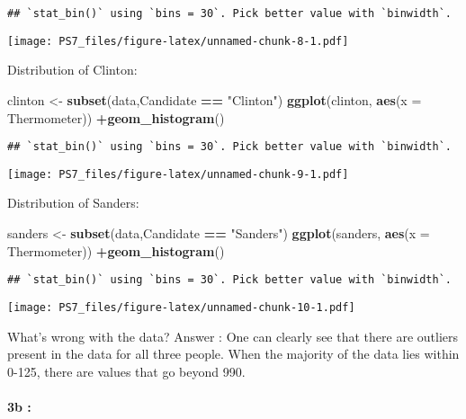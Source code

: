\documentclass[
]{article}
\newenvironment{Shaded}{\begin{snugshade}}{\end{snugshade}}
\newcommand{\AttributeTok}[1]{\textcolor[rgb]{0.13,0.29,0.53}{#1}}
\newcommand{\FunctionTok}[1]{\textcolor[rgb]{0.13,0.29,0.53}{\textbf{#1}}}
\newcommand{\NormalTok}[1]{#1}
\newcommand{\OtherTok}[1]{\textcolor[rgb]{0.56,0.35,0.01}{#1}}
\newcommand{\SpecialCharTok}[1]{\textcolor[rgb]{0.81,0.36,0.00}{\textbf{#1}}}
\newcommand{\StringTok}[1]{\textcolor[rgb]{0.31,0.60,0.02}{#1}}
\begin{document}
\begin{verbatim}
## `stat_bin()` using `bins = 30`. Pick better value with `binwidth`.
\end{verbatim}

\texttt{[image: PS7\_files/figure-latex/unnamed-chunk-8-1.pdf]}

Distribution of Clinton:

\begin{Shaded}
\begin{Highlighting}[]
\NormalTok{clinton }\OtherTok{\textless{}{-}} \FunctionTok{subset}\NormalTok{(data,Candidate }\SpecialCharTok{==} \StringTok{"Clinton"}\NormalTok{)}
\FunctionTok{ggplot}\NormalTok{(clinton, }\FunctionTok{aes}\NormalTok{(}\AttributeTok{x =}\NormalTok{ Thermometer)) }\SpecialCharTok{+}\FunctionTok{geom\_histogram}\NormalTok{()}
\end{Highlighting}
\end{Shaded}

\begin{verbatim}
## `stat_bin()` using `bins = 30`. Pick better value with `binwidth`.
\end{verbatim}

\texttt{[image: PS7\_files/figure-latex/unnamed-chunk-9-1.pdf]}

Distribution of Sanders:

\begin{Shaded}
\begin{Highlighting}[]
\NormalTok{sanders }\OtherTok{\textless{}{-}} \FunctionTok{subset}\NormalTok{(data,Candidate }\SpecialCharTok{==} \StringTok{"Sanders"}\NormalTok{)}
\FunctionTok{ggplot}\NormalTok{(sanders, }\FunctionTok{aes}\NormalTok{(}\AttributeTok{x =}\NormalTok{ Thermometer)) }\SpecialCharTok{+}\FunctionTok{geom\_histogram}\NormalTok{()}
\end{Highlighting}
\end{Shaded}

\begin{verbatim}
## `stat_bin()` using `bins = 30`. Pick better value with `binwidth`.
\end{verbatim}

\texttt{[image: PS7\_files/figure-latex/unnamed-chunk-10-1.pdf]}

What's wrong with the data? Answer : One can clearly see that there are
outliers present in the data for all three people. When the majority of
the data lies within 0-125, there are values that go beyond 990.

\hypertarget{b}{%
\paragraph{3b :}\label{b}}
\end{document}
